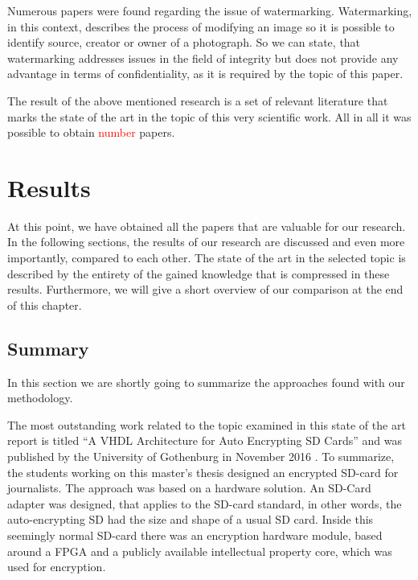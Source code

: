 \documentclass[12pt,a4paper,titlepage,oneside]{scrartcl}
\newcommand\todo[1]{\textcolor{red}{#1}}
\begin{document}
Numerous papers were found regarding the issue of watermarking.
Watermarking, in this context, describes the process of modifying an image so it is possible to identify source, creator or owner of a photograph.
So we can state, that watermarking addresses issues in the field of integrity but does not provide any advantage in terms of confidentiality, as it is required by the topic of this paper.

The result of the above mentioned research is a set of relevant literature that marks the state of the art in the topic of this very scientific work.
All in all it was possible to obtain \todo{number} papers.

\newpage
\section{Results}
At this point, we have obtained all the papers that are valuable for our research.
In the following sections, the results of our research are discussed and even more importantly, compared to each other.
The state of the art in the selected topic is described by the entirety of the gained knowledge that is compressed in these results.
Furthermore, we will give a short overview of our comparison at the end of this chapter.

\subsection{Summary}
In this section we are shortly going to summarize the approaches found with our methodology.

The most outstanding work related to the topic examined in this state of the art report is titled ``A VHDL Architecture for Auto Encrypting SD Cards'' and was published by the University of Gothenburg in November 2016 \cite{Davidsson2016}.
To summarize, the students working on this master's thesis designed an encrypted SD-card for journalists.
The approach was based on a hardware solution.
An SD-Card adapter was designed, that applies to the SD-card standard, in other words, the auto-encrypting SD had the size and shape of a usual SD card.
Inside this seemingly normal SD-card there was an encryption hardware module, based around a FPGA and a publicly available intellectual property core, which was used for encryption.
\end{document}
